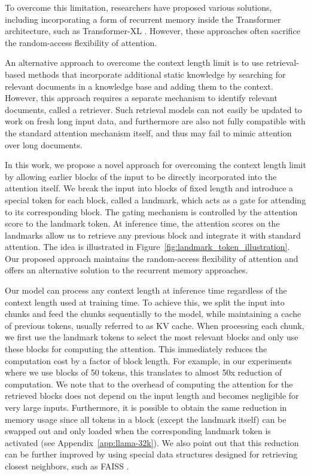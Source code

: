 To overcome this limitation, researchers have proposed various solutions, including incorporating a form of recurrent memory inside the Transformer architecture, such as Transformer-XL \cite{dai_transformer-xl_2019}. However, these approaches often sacrifice the random-access flexibility of attention.

An alternative approach to overcome the context length limit is to use retrieval-based methods that incorporate additional static knowledge by searching for relevant documents in a knowledge base and adding them to the context. However, this approach requires a separate mechanism to identify relevant documents, called a retriever. Such retrieval models can not easily be updated to work on fresh long input data, and furthermore are also not fully compatible with the standard attention mechanism itself, and thus may fail to mimic attention over long documents.

In this work, we propose a novel approach for overcoming the context length limit by allowing earlier blocks of the input to be directly incorporated into the attention itself. We break the input into blocks of fixed length and introduce a special token for each block, called a landmark, which acts as a gate for attending to its corresponding block. The gating mechanism is controlled by the attention score to the landmark token. At inference time, the attention scores on the landmarks allow us to retrieve any previous block and integrate it with standard attention. The idea is illustrated in Figure~\ref{fig:landmark_token_illustration}. Our proposed approach maintains the random-access flexibility of attention and offers an alternative solution to the recurrent memory approaches.

Our model can process any context length at inference time regardless of the context length used at training time. To achieve this, we split the input into chunks and feed the chunks sequentially to the model, while maintaining a cache of previous tokens, usually referred to as KV cache. When processing each chunk, we first use the landmark tokens to select the most relevant blocks and only use these blocks for computing the attention. This immediately reduces the computation cost by a factor of block length. For example, in our experiments where we use blocks of 50 tokens, this translates to almost 50x reduction of computation. We note that to the overhead of computing the attention for the retrieved blocks does not depend on the input length and becomes negligible for very large inputs. Furthermore, it is possible to obtain the same reduction in memory usage since all tokens in a block (except the landmark itself) can be swapped out and only loaded when the corresponding landmark token is activated (see Appendix~\ref{app:llama-32k}). We also point out that this reduction can be further improved by using special data structures designed for retrieving closest neighbors, such as FAISS \cite{johnson_billion-scale_2017}.

